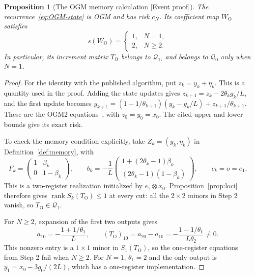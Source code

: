 \documentclass[11pt]{article}
\newcommand{\supportlabel}[1]{\textcolor{blue!60!black}{\small\textsf{[#1]}}}
\newcommand{\eventproof}{\supportlabel{Event proof}}
\numberwithin{equation}{section}
\newtheorem{proposition}[theorem]{Proposition}
\theoremstyle{definition}
\newcommand{\Q}{\mathcal Q}
\DeclareMathOperator{\rank}{rank}
\begin{document}
\begin{proposition}[The OGM memory calculation \eventproof]\label{prop:OGM-memory}
The recurrence~\eqref{eq:OGM-state} is OGM and has risk $c_N$. Its coefficient map $W_{\mathrm O}$ satisfies
\[
 s(W_{\mathrm O})=
 \begin{cases}1,&N=1,\\2,&N\ge2.\end{cases}
\]
In particular, its increment matrix $T_{\mathrm O}$ belongs to $\Q_1$, and belongs to $\Q_0$ only when $N=1$.
\end{proposition}
\begin{proof}
For the identity with the published algorithm, put $z_k=y_k+\eta_k$. This is a quantity used in the proof. Adding the state updates gives
$z_{k+1}=z_k-2\theta_kg_k/L$, and the first update becomes
$y_{k+1}=(1-1/\theta_{k+1})(y_k-g_k/L)+z_{k+1}/\theta_{k+1}$.
These are the OGM2 equations~\cite[Section 7.2]{KF}, with $z_0=y_0=x_0$. The cited upper and lower bounds give its exact risk.

To check the memory condition explicitly, take $Z_k=(y_k,\eta_k)$ in Definition~\ref{def:memory}, with
\[
 F_k=\begin{pmatrix}1&\beta_k\\0&1-\beta_k\end{pmatrix},\qquad
 b_k=-\frac1L
 \begin{pmatrix}1+(2\theta_k-1)\beta_k\\(2\theta_k-1)(1-\beta_k)\end{pmatrix},
 \qquad c_k=o=e_1.
\]
This is a two-register realization initialized by $e_1\otimes x_0$. Proposition~\ref{prop:loci} therefore gives $\rank S_k(T_{\mathrm O})\le1$ at every cut: all the $2\times2$ minors in Step 2 vanish, so $T_{\mathrm O}\in\Q_1$.

For $N\ge2$, expansion of the first two outputs gives
\begin{equation}
 a_{10}=-\frac{1+1/\theta_1}{L},\qquad
 (T_{\mathrm O})_{10}=a_{20}-a_{10}
 =-\frac{1-1/\theta_1}{L\theta_2}\ne0.
 \label{eq:OGM-increment}
\end{equation}
This nonzero entry is a $1\times1$ minor in $S_1(T_{\mathrm O})$, so the one-register equations from Step 2 fail when $N\ge2$. For $N=1$, $\theta_1=2$ and the only output is $y_1=x_0-3g_0/(2L)$, which has a one-register implementation.
\end{proof}
\end{document}
